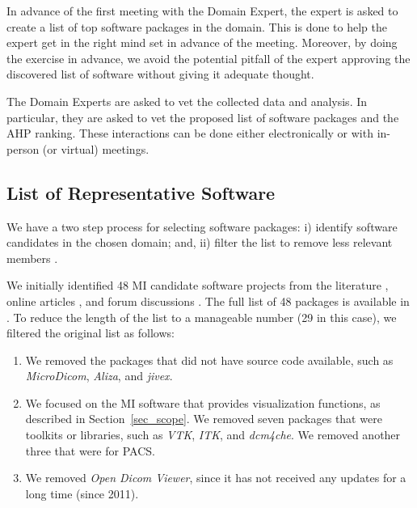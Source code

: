 \documentclass[final, 3p, times, authoryear]{elsarticle}
\begin{document}
In advance of the first meeting with the Domain Expert, the expert is asked to
create a list of top software packages in the domain.  This is done to help
the expert get in the right mind set in advance of the meeting.  Moreover,
by doing the exercise in advance, we avoid the potential pitfall of the expert
approving the discovered list of software without giving it adequate thought.

The Domain Experts are asked to vet the collected data and analysis.  In
particular, they are asked to vet the proposed list of software packages and the
AHP ranking.  These interactions can be done either electronically or with
in-person (or virtual) meetings.

\subsection{List of Representative Software} \label{sec_software_selection}

We have a two step process for selecting software packages: i) identify software
candidates in the chosen domain; and, ii) filter the list to remove less
relevant members \citep{SmithEtAl2021}.

We initially identified 48 MI candidate software projects from the literature
\citep{Bjorn2017, Bruhschwein2019, Haak2015}, online articles \citep{Emms2019,
Hasan2020, Mu2019}, and forum discussions \citep{Samala2014}.  The full list of
48 packages is available in \citet{Dong2021}.  To reduce the length of the list
to a manageable number (29 in this case), we filtered the original list as
follows:

\begin{enumerate}

\item We removed the packages that did not have source code available, such as
\textit{MicroDicom}, \textit{Aliza}, and \textit{jivex}.

\item We focused on the MI software that provides visualization functions, as
described in Section~\ref{sec_scope}. We removed seven packages that were
toolkits or libraries, such as \textit{VTK}, \textit{ITK}, and \textit{dcm4che}.
We removed another three that were for PACS.

\item We removed \textit{Open Dicom Viewer}, since it has not received any
updates for a long time (since 2011).

\end{enumerate}
\end{document}

